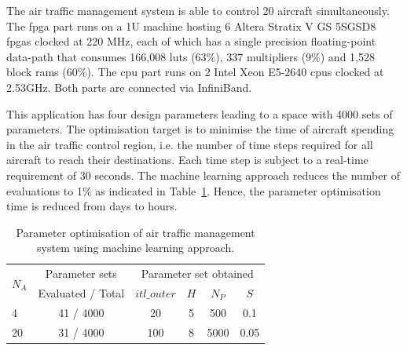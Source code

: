 The air traffic management system is able to control 20 aircraft simultaneously.
The \gls{fpga} part runs on a 1U machine hosting 6 Altera Stratix V GS 5SGSD8 \glspl{fpga} clocked at 220 MHz, 
each of which has a single precision floating-point data-path that consumes 166,008 \glspl{lut} (63\%), 337 multipliers (9\%) and 1,528 block \glspl{ram} (60\%).
The \gls{cpu} part runs on 2 Intel Xeon E5-2640 \glspl{cpu} clocked at 2.53GHz.
Both parts are connected via InfiniBand.

This application has four design parameters leading to a space with 4000 sets of parameters.
The optimisation target is to minimise the time of aircraft spending in the air traffic control region,
i.e. the number of time steps required for all aircraft to reach their destinations.
Each time step is subject to a real-time requirement of 30 seconds.
The machine learning approach reduces the number of evaluations to 1\% as indicated in Table~\ref{tab:dse}.
Hence, the parameter optimisation time is reduced from days to hours.

\begin{table}[ht]
	\begin{spacing}{1.0}
	\caption{Parameter optimisation of air traffic management system using machine learning approach.}
	\label{tab:dse}
	\centering
	\smallskip
	\begin{threeparttable}
		\begin{tabular}{l|c|c c c c}
			\hline
			\multirow{2}{*}{$N_A$}			& Parameter	sets		& \multicolumn{4}{|c}{Parameter set obtained} \\
			\cline{3-6}
																	& Evaluated / Total					& $itl\_outer$  		& $H$ & $N_P$ & $S$ \\
			\hline
			\hline
			4 													& 41 / 4000											& 20								&	5		&	500	  & 0.1 \\
			20													& 31 / 4000 											& 100								&	8		&	5000	& 0.05 \\
			\hline
		\end{tabular}
	\end{threeparttable}
	\end{spacing}
\end{table}


